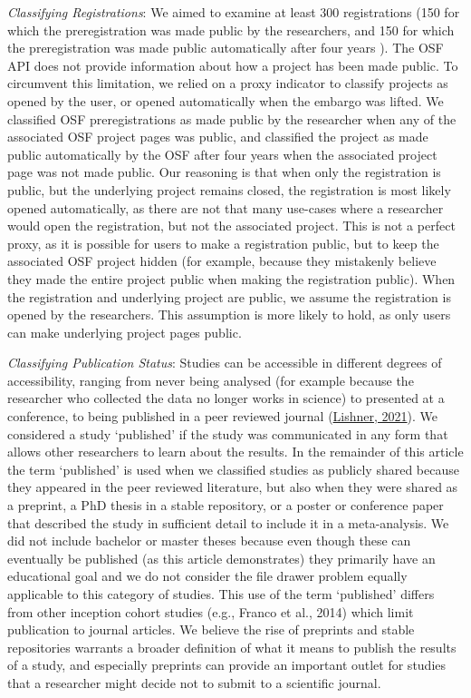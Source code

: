 \documentclass[
  ,jou, a4paper,floatsintext]{apa6}
\begin{document}
\emph{Classifying Registrations}: We aimed to examine at least 300 registrations (150 for which the preregistration was made public by the researchers, and 150 for which the preregistration was made public automatically after four years ). The OSF API does not provide information about how a project has been made public. To circumvent this limitation, we relied on a proxy indicator to classify projects as opened by the user, or opened automatically when the embargo was lifted. We classified OSF preregistrations as made public by the researcher when any of the associated OSF project pages was public, and classified the project as made public automatically by the OSF after four years when the associated project page was not made public. Our reasoning is that when only the registration is public, but the underlying project remains closed, the registration is most likely opened automatically, as there are not that many use-cases where a researcher would open the registration, but not the associated project. This is not a perfect proxy, as it is possible for users to make a registration public, but to keep the associated OSF project hidden (for example, because they mistakenly believe they made the entire project public when making the registration public). When the registration and underlying project are public, we assume the registration is opened by the researchers. This assumption is more likely to hold, as only users can make underlying project pages public.

\emph{Classifying Publication Status}: Studies can be accessible in different degrees of accessibility, ranging from never being analysed (for example because the researcher who collected the data no longer works in science) to presented at a conference, to being published in a peer reviewed journal (\protect\hyperlink{ref-lishner_sorting_2021}{Lishner, 2021}). We considered a study `published' if the study was communicated in any form that allows other researchers to learn about the results. In the remainder of this article the term `published' is used when we classified studies as publicly shared because they appeared in the peer reviewed literature, but also when they were shared as a preprint, a PhD thesis in a stable repository, or a poster or conference paper that described the study in sufficient detail to include it in a meta-analysis. We did not include bachelor or master theses because even though these can eventually be published (as this article demonstrates) they primarily have an educational goal and we do not consider the file drawer problem equally applicable to this category of studies. This use of the term `published' differs from other inception cohort studies (e.g., Franco et al., 2014) which limit publication to journal articles. We believe the rise of preprints and stable repositories warrants a broader definition of what it means to publish the results of a study, and especially preprints can provide an important outlet for studies that a researcher might decide not to submit to a scientific journal.
\end{document}
